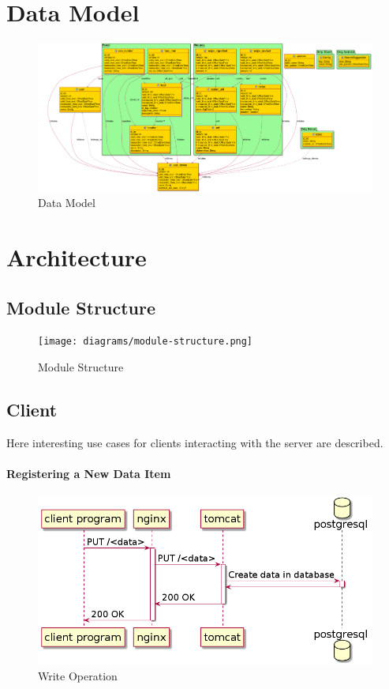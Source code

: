 \documentclass{memoir}
\begin{document}
\section{Data Model}

\begin{figure}[!h]
\includegraphics[width=1.25\linewidth]{diagrams/data-model.png}
\caption{Data Model}
\end{figure}

\section{Architecture}

\subsection{Module Structure}

\begin{figure}[!h]
\texttt{[image: diagrams/module-structure.png]}
\caption{Module Structure}
\end{figure}

\subsection{Client}

Here interesting use cases for clients interacting with the server are described.

\paragraph{Registering a New Data Item\\}

\begin{figure}[!h]
\includegraphics[width=\linewidth]{diagrams/put-data.png}
\caption{Write Operation}
\end{figure}
\end{document}
